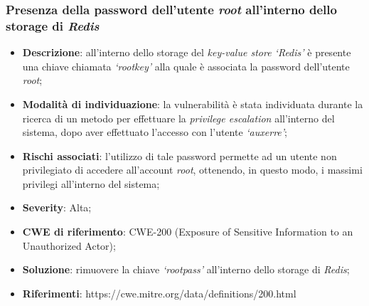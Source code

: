 \documentclass[a4paper,11pt,oneside,top=3cm,bottom=3cm,left=3.5cm,right=3.5cm,openright,reqno,table]{book}
\begin{document}
\subsubsection{Presenza della password dell'utente \emph{root} all'interno dello storage di \emph{Redis}}
\begin{itemize}
    \item \textbf{Descrizione}: all'interno dello storage del \emph{key-value store `Redis'} è presente una chiave chiamata \emph{`rootkey'} alla quale è associata la password dell'utente \emph{root};
    \item \textbf{Modalità di individuazione}: la vulnerabilità è stata individuata durante la ricerca di un metodo per effettuare la \emph{privilege escalation} all'interno del sistema, dopo aver effettuato l'accesso con l'utente \emph{`auxerre'};
    \item \textbf{Rischi associati}: l'utilizzo di tale password permette ad un utente non privilegiato di accedere all'account \emph{root}, ottenendo, in questo modo, i massimi privilegi all'interno del sistema;
    \item \textbf{Severity}: Alta;
    \item \textbf{CWE di riferimento}: CWE-200 (Exposure of Sensitive Information to an Unauthorized Actor);
    \item \textbf{Soluzione}: rimuovere la chiave \emph{`rootpass'} all'interno dello storage di \emph{Redis};
    \item \textbf{Riferimenti}: https://cwe.mitre.org/data/definitions/200.html
\end{itemize}


\end{document}
